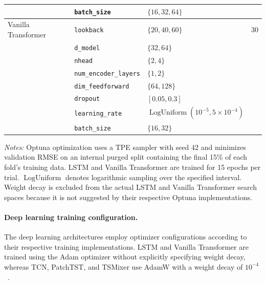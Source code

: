 \documentclass[12pt,twoside]{ord}
\begin{document}
\begin{table}[htbp]
\begin{tabular}{lllr}
     & \texttt{batch\_size}    & $\{16, 32, 64\}$                            & \\
\hline
Vanilla Transformer & \texttt{lookback}           & $\{20, 40, 60\}$                                   & 30 \\
                    & \texttt{d\_model}           & $\{32, 64\}$                                       & \\
                    & \texttt{nhead}              & $\{2, 4\}$                                         & \\
                    & \texttt{num\_encoder\_layers}& $\{1, 2\}$                                        & \\
                    & \texttt{dim\_feedforward}   & $\{64, 128\}$                                      & \\
                    & \texttt{dropout}            & $[0.05, 0.3]$                                      & \\
                    & \texttt{learning\_rate}      & $\operatorname{LogUniform}(10^{-5}, 5\times 10^{-4})$ & \\
                    & \texttt{batch\_size}         & $\{16, 32\}$                                       & \\
\hline
\end{tabular}
\par\vspace{4pt}\parbox{\linewidth}{\fontsize{9pt}{12pt}\selectfont\textit{Notes:} Optuna optimization uses a TPE sampler with seed 42 and minimizes validation RMSE on an internal purged split containing the final 15\% of each fold's training data. LSTM and Vanilla Transformer are trained for 15 epochs per trial. $\operatorname{LogUniform}$ denotes logarithmic sampling over the specified interval. Weight decay is excluded from the actual LSTM and Vanilla Transformer search spaces because it is not suggested by their respective Optuna implementations.}
\end{table}

\paragraph{Deep learning training configuration.} The deep learning architectures employ optimizer configurations according to their respective training implementations. LSTM and Vanilla Transformer are trained using the Adam optimizer without explicitly specifying weight decay, whereas TCN, PatchTST, and TSMixer use AdamW with a weight decay of $10^{-4}$~\cite{kingma2014}.
\end{document}
